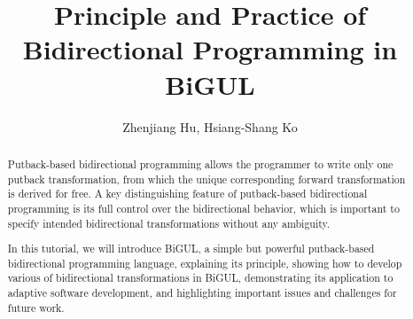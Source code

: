 \documentclass{llncs}
\title{Principle and Practice of Bidirectional Programming in BiGUL}
\author{Zhenjiang Hu,  Hsiang-Shang Ko}
\institute{
National Institute of Informatics, Japan\\
{\{hu,hsiang-shang\}@nii.ac.jp}
}
\begin{document}
\frontmatter
\mainmatter

\maketitle

\begin{abstract}
Putback-based bidirectional programming allows the programmer to write
only one putback transformation, from which the unique corresponding
forward transformation is derived for free. A key distinguishing
feature of putback-based bidirectional programming is its full control
over the bidirectional behavior, which is important to specify
intended bidirectional transformations without any ambiguity.

In this tutorial, we will introduce BiGUL, a simple but powerful
putback-based bidirectional programming language, explaining its
principle, showing how to develop various of bidirectional
transformations in BiGUL, demonstrating its application to adaptive
software development, and highlighting important issues and challenges
for future work.



\end{abstract}





%






%

\end{document}
